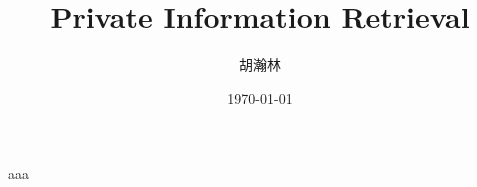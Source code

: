 \documentclass{beamer}
\title{\bfseries Private Information Retrieval}
\author{胡瀚林}
\date{\today}
\begin{document}
\maketitle
\begin{frame}
aaa \cite{heurix_taxonomy_2015}
\end{frame}
\begin{frame}
        \printbibliography
\end{frame}
\end{document}
